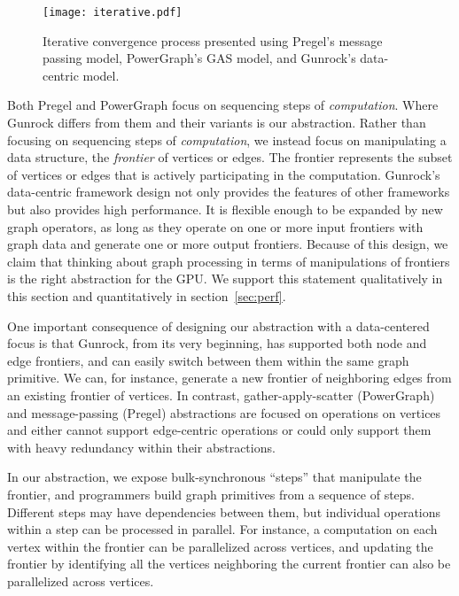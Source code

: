 \documentclass[format=acmsmall,review=false,screen=true]{acmart}
\begin{document}
\begin{figure}
  \centering
  \texttt{[image: iterative.pdf]}
  \centering
  \caption[Iterative convergence process illustration.]{Iterative
    convergence process presented using Pregel's message passing
    model, PowerGraph's GAS model, and Gunrock's data-centric model.}
  \label{fig:icp}
\end{figure}

Both Pregel and PowerGraph focus on sequencing steps of
\emph{computation}. Where Gunrock differs from them and their variants
is our abstraction. Rather than focusing on sequencing steps of
\emph{computation}, we instead focus on manipulating a data structure,
the \emph{frontier} of vertices or edges. The frontier represents the
subset of vertices or edges that is actively participating in the
computation. Gunrock's data-centric framework design not only provides
the features of other frameworks but also provides high performance.
It is flexible enough to be expanded by new graph operators, as long
as they operate on one or more input frontiers with graph data and
generate one or more output frontiers. Because of this design, we
claim that thinking about graph processing in terms of manipulations
of frontiers is the right abstraction for the GPU\@. We support this
statement qualitatively in this section and quantitatively in
section~\ref{sec:perf}.

One important consequence of designing our abstraction with a
data-centered focus is that Gunrock, from its very beginning, has
supported both node and edge frontiers, and can easily switch between
them within the same graph primitive. We can, for instance, generate a
new frontier of neighboring edges from an existing frontier of
vertices. In contrast, gather-apply-scatter (PowerGraph) and
message-passing (Pregel) abstractions are focused on operations on
vertices and either cannot support edge-centric operations or could
only support them with heavy redundancy within their abstractions.

In our abstraction, we expose bulk-synchronous ``steps''
that manipulate the frontier, and programmers build graph primitives
from a sequence of steps. Different steps may have dependencies
between them, but individual operations within a step can be processed
in parallel. For instance, a computation on each vertex within the
frontier can be parallelized across vertices, and updating the
frontier by identifying all the vertices neighboring the current
frontier can also be parallelized across vertices.
\end{document}
